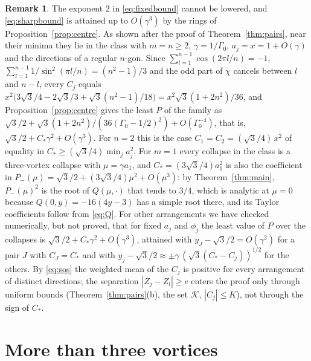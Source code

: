 \documentclass[11pt]{article}
\theoremstyle{definition}
\newtheorem{remark}{Remark}
\begin{document}
\begin{remark}\label{rem:pairsbound}
The exponent $2$ in \eqref{eq:fixedbound} cannot be lowered, and \eqref{eq:sharpbound} is attained up to $O(\gamma^3)$ by the rings of Proposition~\ref{prop:centre}. As shown after the proof of Theorem~\ref{thm:pairs}, near their minima they lie in the class with $m = n \ge 2$, $\gamma = 1/\Gamma_0$, $a_j = x = 1 + O(\gamma)$ and the directions of a regular $n$-gon. Since $\sum_{l=1}^{n-1}\cos(2\pi l/n) = -1$, $\sum_{l=1}^{n-1} 1/\sin^2(\pi l/n) = (n^2 - 1)/3$ and the odd part of $\chi$ cancels between $l$ and $n - l$, every $C_j$ equals $x^2\bigl(3\sqrt{3}/4 - 2\sqrt{3}/3 + \sqrt{3}(n^2 - 1)/18\bigr) = x^2\sqrt{3}(1 + 2n^2)/36$, and Proposition~\ref{prop:centre} gives the least $P$ of the family as $\sqrt{3}/2 + \sqrt{3}(1 + 2n^2)/(36(\Gamma_0 - 1/2)^2) + O(\Gamma_0^{-4})$, that is, $\sqrt{3}/2 + C_*\gamma^2 + O(\gamma^3)$. For $n = 2$ this is the case $C_1 = C_2 = (\sqrt{3}/4)\,x^2$ of equality in $C_* \ge (\sqrt{3}/4)\min_j a_j^2$. For $m = 1$ every collapse in the class is a three-vortex collapse with $\mu = \gamma a_1$, and $C_* = (3\sqrt{3}/4)a_1^2$ is also the coefficient in $P_-(\mu) = \sqrt{3}/2 + (3\sqrt{3}/4)\mu^2 + O(\mu^3)$: by Theorem~\ref{thm:main}, $P_-(\mu)^2$ is the root of $Q(\mu, \cdot)$ that tends to $3/4$, which is analytic at $\mu = 0$ because $Q(0, y) = -16(4y - 3)$ has a simple root there, and its Taylor coefficients follow from \eqref{eq:Q}. For other arrangements we have checked numerically, but not proved, that for fixed $a_j$ and $\phi_j$ the least value of $P$ over the collapses is $\sqrt{3}/2 + C_*\gamma^2 + O(\gamma^3)$, attained with $y_J - \sqrt{3}/2 = O(\gamma^2)$ for a pair $J$ with $C_J = C_*$ and with $y_j - \sqrt{3}/2 \approx \pm\gamma\,(\sqrt{3}(C_* - C_j))^{1/2}$ for the others. By \eqref{eq:sos} the weighted mean of the $C_j$ is positive for every arrangement of distinct directions; the separation $|Z_j - Z_l| \ge c$ enters the proof only through uniform bounds (Theorem~\ref{thm:pairs}(b), the set $\mathcal{K}$, $|C_j| \le K$), not through the sign of $C_*$.
\end{remark}

\section{More than three vortices}\label{sec:more}
\end{document}
